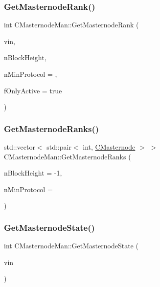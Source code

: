 \mbox{\label{class_c_masternode_man_ae1dae6a840e09fa1dd05a0fe92f8a037}} 
\subsubsection{\texorpdfstring{Get\+Masternode\+Rank()}{GetMasternodeRank()}}
{\footnotesize\ttfamily int C\+Masternode\+Man\+::\+Get\+Masternode\+Rank (\begin{DoxyParamCaption}\item[{const C\+Tx\+In \&}]{vin,  }\item[{int}]{n\+Block\+Height,  }\item[{int}]{n\+Min\+Protocol = {},  }\item[{bool}]{f\+Only\+Active = {\ttfamily true} }\end{DoxyParamCaption})}

\mbox{\label{class_c_masternode_man_adb8c916326fe125f9749c8f68bcd9a17}} 
\subsubsection{\texorpdfstring{Get\+Masternode\+Ranks()}{GetMasternodeRanks()}}
{\footnotesize\ttfamily std\+::vector$<$ std\+::pair$<$ int, \mbox{\hyperlink{class_c_masternode}{C\+Masternode}} $>$ $>$ C\+Masternode\+Man\+::\+Get\+Masternode\+Ranks (\begin{DoxyParamCaption}\item[{int}]{n\+Block\+Height = {\ttfamily -\/1},  }\item[{int}]{n\+Min\+Protocol = {} }\end{DoxyParamCaption})}

\mbox{\label{class_c_masternode_man_ae027eb0ffa0561fbb08166f8277de63f}} 
\subsubsection{\texorpdfstring{Get\+Masternode\+State()}{GetMasternodeState()}\hspace{0.1cm}{\footnotesize\ttfamily [1/2]}}
{\footnotesize\ttfamily int C\+Masternode\+Man\+::\+Get\+Masternode\+State (\begin{DoxyParamCaption}\item[{const C\+Tx\+In \&}]{vin }\end{DoxyParamCaption})}

